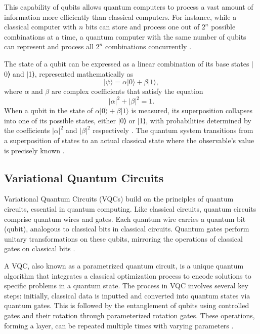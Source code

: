 This capability of qubits allows quantum computers to process a vast amount of information more efficiently than classical computers. For instance, while a classical computer with $n$ bits can store and process one out of $2^n$  possible combinations at a time, a quantum computer with the same number of qubits can represent and process all $2^n$ combinations concurrently \cite{homeister2018quantum}.

The state of a qubit can be expressed as a linear combination of its base states $|$0⟩ and $|$1⟩, represented mathematically as
\begin{equation}
|\psi\rangle = \alpha|0\rangle + \beta|1\rangle,
\label{qubit}
\end{equation}
where $\alpha$ and $\beta$ are complex coefficients that satisfy the equation
\begin{equation}
|\alpha|^2 + |\beta|^2 = 1.
\end{equation}
When a qubit in the state of $\alpha \vert 0 \rangle + \beta \vert 1 \rangle$ is measured, its superposition collapses into one of its possible states, either $|$0⟩ or $|$1⟩, with probabilities determined by the coefficients $|\alpha|^2$ and $|\beta|^2$ respectively \cite{mcmahon2007quantum}. The quantum system transitions from a superposition of states to an actual classical state where the observable's value is precisely known \cite{nielsen2010quantum}.

\subsection{Variational Quantum Circuits}
Variational Quantum Circuits (VQCs) build on the principles of quantum circuits, essential in quantum computing. Like classical circuits, quantum circuits comprise quantum wires and gates. Each quantum wire carries a quantum bit (qubit), analogous to classical bits in classical circuits. Quantum gates perform unitary transformations on these qubits, mirroring the operations of classical gates on classical bits \cite{homeister2018quantum}.

A VQC, also known as a parametrized quantum circuit, is a unique quantum algorithm that integrates a classical optimization process to encode solutions to specific problems in a quantum state. The process in VQC involves several key steps: initially, classical data is inputted and converted into quantum states via quantum gates. This is followed by the entanglement of qubits using controlled gates and their rotation through parameterized rotation gates. These operations, forming a layer, can be repeated multiple times with varying parameters \cite{9144562}.

